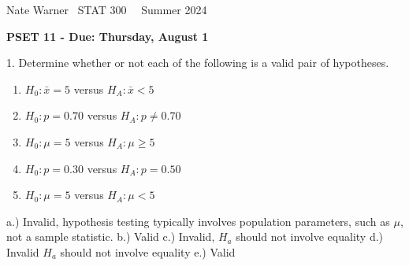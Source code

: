 \documentclass{report}
\title{\Huge{}}
\author{\huge{Nathan Warner}}
\date{\huge{}}
\begin{document}
 \pagebreak \bigbreak \noindent
 Nate Warner \ \quad \quad \quad \quad \quad \quad \quad \quad \quad \quad \quad \quad  STAT 300 \quad  \quad \quad \quad \quad \quad \quad \quad \quad \ \ \quad Summer 2024
 \begin{center}
     \textbf{PSET 11 - Due: Thursday, August 1}
 \end{center}
 \bigbreak \noindent 
 \begin{mdframed}
1. Determine whether or not each of the following is a valid pair of hypotheses.
\begin{enumerate}[label=(\alph*)]
    \item \( H_0: \bar{x} = 5 \) versus \( H_A: \bar{x} < 5 \)
    \item \( H_0: p = 0.70 \) versus \( H_A: p \neq 0.70 \)
    \item \( H_0: \mu = 5 \) versus \( H_A: \mu \geq 5 \)
    \item \( H_0: p = 0.30 \) versus \( H_A: p = 0.50 \)
    \item \( H_0: \mu = 5 \) versus \( H_A: \mu < 5 \)
\end{enumerate}
\end{mdframed}
\bigbreak \noindent 
a.) Invalid, hypothesis testing typically  involves population parameters, such as $\mu$, not a sample statistic.
\bigbreak \noindent 
b.) Valid
\bigbreak \noindent 
c.) Invalid, $H_{a}$ should not involve equality
\bigbreak \noindent 
d.) Invalid $H_{a}$ should not involve equality
\bigbreak \noindent 
e.) Valid
\end{document}
